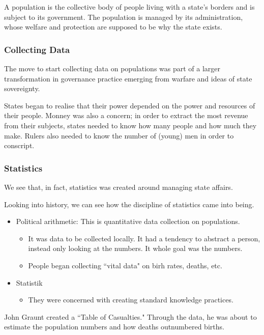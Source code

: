 \documentclass[openany]{book}
\begin{document}
\begin{defn}[Population]
	A population is the collective body of people living with a state's borders and is subject to its government. The population is managed by its administration, whose welfare and protection are supposed to be why the state exists.
\end{defn}

\subsubsection{Collecting Data}
The move to start collecting data on populations was part of a larger transformation in governance practice emerging from warfare and ideas of state sovereignty.

States began to realise that their power depended on the power and resources of their people. Monney was also a concern; in order to extract the most revenue from their subjects, states needed to know how many people and how much they make. Rulers also needed to know the number of (young) men in order to conscript.

\subsubsection{Statistics}
We see that, in fact, statistics was created around managing state affairs.

Looking into history, we can see how the discipline of statistics came into being.
\begin{itemize}
	\item Political arithmetic: This is quantitative data collection on populations.
	\begin{itemize}
		\item It was data to be collected locally. It had a tendency to abstract a person, instead only looking at the numbers. It whole goal was the numbers.
		\item People began collecting ``vital data" on birh rates, deaths, etc.
	\end{itemize}
	\item Statistik
	\begin{itemize}
		\item They were concerned with creating standard knowledge practices.
	\end{itemize}
\end{itemize}

\begin{example}
	John Graunt created a ``Table of Casualties." Through the data, he was about to estimate the population numbers and how deaths outnumbered births.
\end{example}
\end{document}
